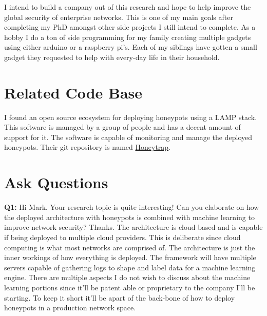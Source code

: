         I intend to build a company out of this research and hope to help improve the global security of enterprise networks.
        This is one of my main goals after completing my PhD amongst other side projects I still intend to complete.
        As a hobby I do a ton of side programming for my family creating multiple gadgets using either arduino or a raspberry pi's.
        Each of my siblings have gotten a small gadget they requested to help with every-day life in their household.

    \section{Related Code Base}
    \label{sec:code}
        I found an open source ecosystem for deploying honeypots using a LAMP stack.
        This software is managed by a group of people and has a decent amount of support for it.
        The software is capable of monitoring and manage the deployed honeypots.
        Their git repository is named \href{https://github.com/honeytrap/honeytrap}{Honeytrap}.

    \section{Ask Questions}

    \textbf{Q1:} Hi Mark. Your research topic is quite interesting! Can you elaborate on how the deployed architecture with honeypots is combined with machine learning to improve network security? Thanks.
    \newline
    The architecture is cloud based and is capable if being deployed to multiple cloud providers. This is deliberate since cloud computing is what most networks are comprised of. The architecture is just the inner workings of how everything is deployed. The framework will have multiple servers capable of gathering logs to shape and label data for a machine learning engine. There are multiple aspects I do not wish to discuss about the machine learning portions since it'll be patent able or proprietary to the company I'll be starting. To keep it short it'll be apart of the back-bone of how to deploy honeypots in a production network space.



% 
